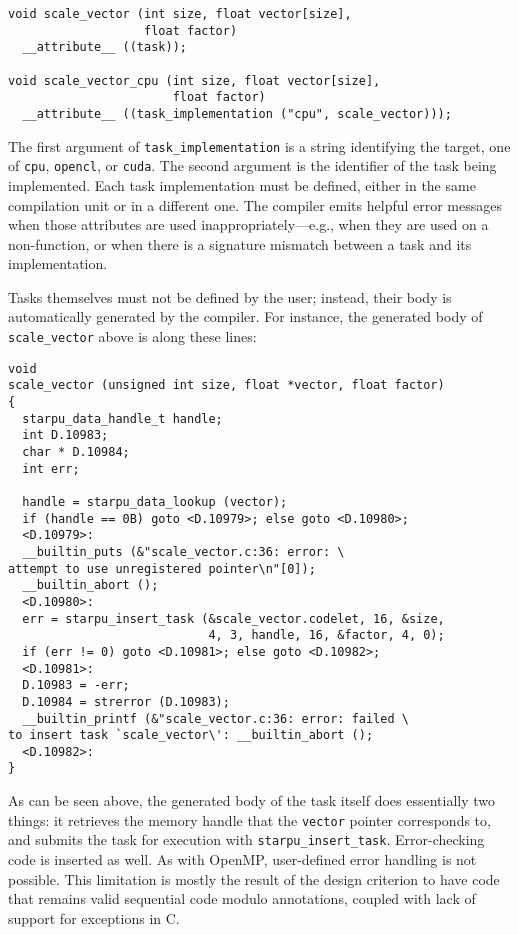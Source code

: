 \documentclass[twoside, a4paper, 10pt]{article}
\begin{document}
\begin{verbatim}
void scale_vector (int size, float vector[size],
                   float factor)
  __attribute__ ((task));

void scale_vector_cpu (int size, float vector[size],
                       float factor)
  __attribute__ ((task_implementation ("cpu", scale_vector)));
\end{verbatim}

The first argument of \texttt{task\_implementation} is a string identifying the
target, one of \texttt{cpu}, \texttt{opencl}, or \texttt{cuda}.  The second argument is the
identifier of the task being implemented.  Each task implementation must
be defined, either in the same compilation unit or in a different one.
The compiler emits helpful error messages when those attributes are used
inappropriately---e.g., when they are used on a non-function, or when
there is a signature mismatch between a task and its implementation.

Tasks themselves must not be defined by the user; instead, their body
is automatically generated by the compiler.  For instance, the
generated body of \texttt{scale\_vector} above is along these lines:


\begin{verbatim}
void
scale_vector (unsigned int size, float *vector, float factor)
{
  starpu_data_handle_t handle;
  int D.10983;
  char * D.10984;
  int err;

  handle = starpu_data_lookup (vector);
  if (handle == 0B) goto <D.10979>; else goto <D.10980>;
  <D.10979>:
  __builtin_puts (&"scale_vector.c:36: error: \
attempt to use unregistered pointer\n"[0]);
  __builtin_abort ();
  <D.10980>:
  err = starpu_insert_task (&scale_vector.codelet, 16, &size,
                            4, 3, handle, 16, &factor, 4, 0);
  if (err != 0) goto <D.10981>; else goto <D.10982>;
  <D.10981>:
  D.10983 = -err;
  D.10984 = strerror (D.10983);
  __builtin_printf (&"scale_vector.c:36: error: failed \
to insert task `scale_vector\': __builtin_abort ();
  <D.10982>:
}
\end{verbatim}

As can be seen above, the generated body of the task itself does
essentially two things: it retrieves the memory handle that the \texttt{vector}
pointer corresponds to, and submits the task for execution with
\texttt{starpu\_insert\_task}.  Error-checking code is inserted as well.  As with
OpenMP, user-defined error handling is not possible.  This limitation is
mostly the result of the design criterion to have code that remains
valid sequential code modulo annotations, coupled with lack of support
for exceptions in C.
\end{document}
